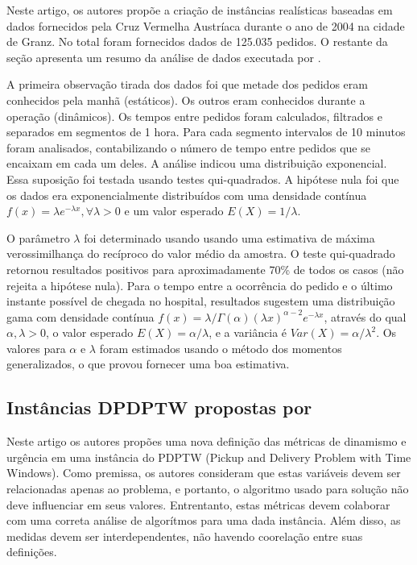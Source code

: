 \documentclass{anpet}
\begin{document}
Neste artigo, os autores propõe a criação de instâncias realísticas baseadas em dados fornecidos pela Cruz Vermelha Austríaca durante o ano de 2004 na cidade de Granz. No total foram fornecidos dados de 125.035 pedidos. O restante da seção apresenta um resumo da análise de dados executada por \textcite{kritzinger_warteschlangentheorie_2008}.

A primeira observação tirada dos dados foi que metade dos pedidos eram conhecidos pela manhã (estáticos). Os outros eram conhecidos durante a operação (dinâmicos). Os tempos entre pedidos foram calculados, filtrados e separados em segmentos de 1 hora. Para cada segmento intervalos de 10 minutos foram analisados, contabilizando o número de tempo entre pedidos que se encaixam em cada um deles. A análise indicou uma distribuição exponencial. Essa suposição foi testada usando testes qui-quadrados. A hipótese nula foi que os dados era exponencialmente distribuídos com uma densidade contínua $f(x) = \lambda e^{-\lambda x}, \forall \lambda>0$ e um valor esperado $E(X) = 1/\lambda$.

O parâmetro $\lambda$ foi determinado usando usando uma estimativa de máxima verossimilhança do recíproco do valor médio da amostra. O teste qui-quadrado retornou resultados positivos para aproximadamente 70\% de todos os casos (não rejeita a hipótese nula). Para o tempo entre a ocorrência do pedido e o último instante possível de chegada no hospital, resultados sugestem uma distribuição gama com densidade contínua $f(x) = \lambda/\Gamma(\alpha)(\lambda x)^{\alpha - 2}e^{-\lambda x}$, através do qual $\alpha, \lambda > 0$, o valor esperado $E(X)=\alpha/\lambda$, e a variância é $Var(X) = \alpha/\lambda^2$. Os valores para $\alpha$ e $\lambda$ foram estimados usando o método dos momentos generalizados, o que provou fornecer uma boa estimativa.

\subsection{Instâncias DPDPTW propostas por \textcite{van_lon_measures_2016}}
Neste artigo os autores propões uma nova definição das métricas de dinamismo e urgência em uma instância do PDPTW (Pickup and Delivery Problem with Time Windows). Como premissa, os autores consideram que estas variáveis devem ser relacionadas apenas ao problema, e portanto, o algoritmo usado para solução não deve influenciar em seus valores. Entrentanto, estas métricas devem colaborar com uma correta análise de algorítmos para uma dada instância. Além disso, as medidas devem ser interdependentes, não havendo coorelação entre suas definições.
\end{document}
